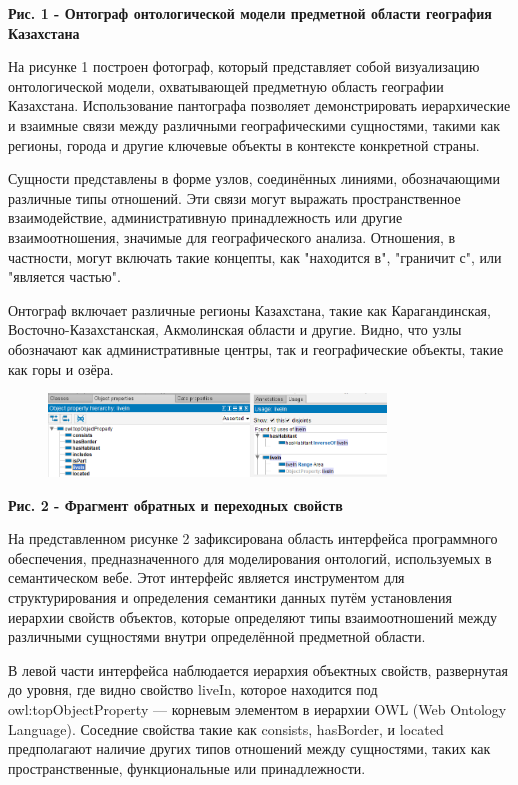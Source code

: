 \textbf{Рис. 1 - Онтограф онтологической модели предметной области
география Казахстана}

На рисунке 1 построен фотограф, который представляет собой визуализацию
онтологической модели, охватывающей предметную область географии
Казахстана. Использование пантографа позволяет демонстрировать
иерархические и взаимные связи между различными географическими
сущностями, такими как регионы, города и другие ключевые объекты в
контексте конкретной страны.

Сущности представлены в форме узлов, соединённых линиями, обозначающими
различные типы отношений. Эти связи могут выражать пространственное
взаимодействие, административную принадлежность или другие
взаимоотношения, значимые для географического анализа. Отношения, в
частности, могут включать такие концепты, как "находится в", "граничит
с", или "является частью".

Онтограф включает различные регионы Казахстана, такие как
Карагандинская, Восточно-Казахстанская, Акмолинская области и другие.
Видно, что узлы обозначают как административные центры, так и
географические объекты, такие как горы и озёра.

\begin{figure}[H]
	\centering
	\includegraphics[width=0.8\textwidth]{assets/39}
	\caption*{}
\end{figure}

\textbf{Рис. 2 - Фрагмент обратных и переходных свойств}

На представленном рисунке 2 зафиксирована область интерфейса
программного обеспечения, предназначенного для моделирования онтологий,
используемых в семантическом вебе. Этот интерфейс является инструментом
для структурирования и определения семантики данных путём установления
иерархии свойств объектов, которые определяют типы взаимоотношений между
различными сущностями внутри определённой предметной области.

В левой части интерфейса наблюдается иерархия объектных свойств,
развернутая до уровня, где видно свойство
\textquotesingle liveIn\textquotesingle, которое находится под
\textquotesingle owl:topObjectProperty\textquotesingle{} --- корневым
элементом в иерархии OWL (Web Ontology Language). Соседние свойства
такие как \textquotesingle consists\textquotesingle,
\textquotesingle hasBorder\textquotesingle, и
\textquotesingle located\textquotesingle{} предполагают наличие других
типов отношений между сущностями, таких как пространственные,
функциональные или принадлежности.

